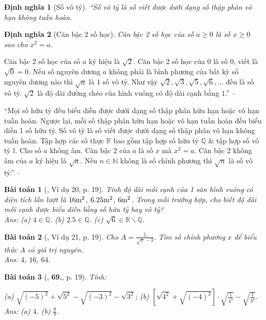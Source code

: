\documentclass{article}
\newtheorem{baitoan}{Bài toán}
\newtheorem{dinhnghia}{Định nghĩa}
\begin{document}
\begin{dinhnghia}[Số vô tỷ]
	``\emph{Số vô tỷ} là số viết được dưới dạng số thập phân vô hạn không tuần hoàn.
\end{dinhnghia}

\begin{dinhnghia}[Căn bậc 2 số học]
	\emph{Căn bậc 2 số học} của số $a\ge 0$ là số $x\ge 0$ sao cho $x^2 = a$.
\end{dinhnghia}
Căn bậc 2 số học của số $a$ ký hiệu là $\sqrt{2}$. Căn bậc 2 số học của $0$ là số $0$, viết là $\sqrt{0} = 0$. Nếu số nguyên dương $a$ không phải là bình phương của bất kỳ số nguyên dương nào thì $\sqrt{a}$ là 1 số vô tỷ. Như vậy $\sqrt{2},\sqrt{3},\sqrt{5},\sqrt{6},\ldots$ đều là số vô tỷ. $\sqrt{2}$ là độ dài đường chéo của hình vuông có độ dài cạnh bằng $1$.'' -- \cite[Chap. 2, \S1, p. 19]{Tuyen_Toan_7}

``Mọi số hữu tỷ đều biểu diễn được dưới dạng số thập phân hữu hạn hoặc vô hạn tuần hoàn. Ngược lại, mỗi số thập phân hữu hạn hoặc vô hạn tuần hoàn đều biểu diễn 1 số hữu tỷ. Số vô tỷ là số viết được dưới dạng số thập phân vô hạn không tuần hoàn. Tập hợp các số thực $\mathbb{R}$ bao gồm tập hợp số hữu tỷ $\mathbb{Q}$ \& tập hợp số vô tỷ $\mathbb{I}$. Cho số $a$ không âm. Căn bậc 2 của $a$ là số $x$ mà $x^2 = a$. Căn bậc 2 không âm của $a$ ký hiệu là $\sqrt{a}$. Nếu $n\in\mathbb{N}$ không là số chính phương thì $\sqrt{n}$ là số vô tỷ.'' -- \cite[\S7]{Binh_Toan_7_tap_1}

\begin{baitoan}[\cite{Tuyen_Toan_7}, Ví dụ 20, p. 19]
	Tính độ dài mỗi cạnh của 1 sân hình vuông có diện tích lần lượt là $\rm16m^2$, $\rm6.25m^2$, $\rm6m^2$. Trong mỗi trường hợp, cho biết độ dài mỗi cạnh được biểu diễn bằng số hữu tỷ hay vô tỷ?\\\mbox{}\hfill{\sf Ans:} (a) $4\in\mathbb{Q}$. (b) $2.5\in\mathbb{Q}$. (c) $\sqrt{6}\in\mathbb{R}\backslash\mathbb{Q}$.
\end{baitoan}

\begin{baitoan}[\cite{Tuyen_Toan_7}, Ví dụ 21, p. 19]
	Cho $A = \frac{5}{\sqrt{x} - 3}$. Tìm số chính phương $x$ để biểu thức $A$ có giá trị nguyên.\\\mbox{}\hfill{\sf Ans:} $4$, $16$, $64$.
\end{baitoan}

\begin{baitoan}[\cite{Tuyen_Toan_7}, \textbf{69.}, p. 19]
	Tính:
	
		(a) $\sqrt{(-5)^2} + \sqrt{5^2} - \sqrt{(-3)^2} - \sqrt{3^2}$;
		(b) $\left[\sqrt{4^2} + \sqrt{(-4)^2}\right]\cdot\sqrt{\frac{1}{4^3}} - \sqrt{\frac{1}{3^4}}$.
	\\\mbox{}\hfill{\sf Ans:} (a) $4$. (b) $\frac{8}{9}$.
\end{baitoan}
\end{document}
